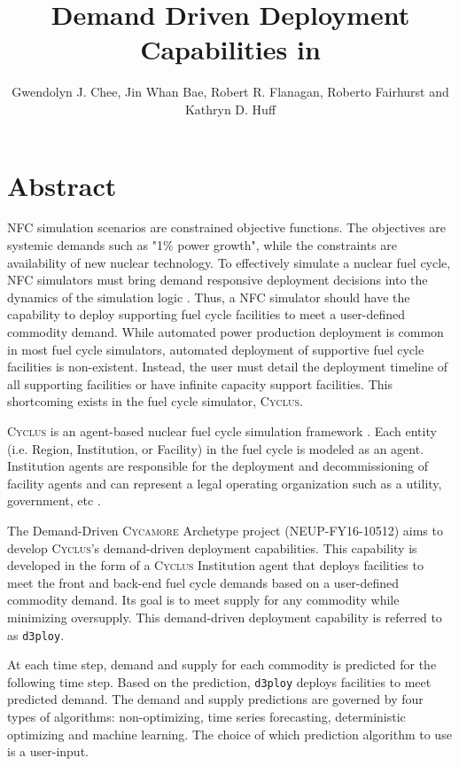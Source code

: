 \documentclass{anstrans}
\title{Demand Driven Deployment Capabilities in \Cyclus}
\author{Gwendolyn J. Chee, Jin Whan Bae, Robert R. Flanagan, Roberto Fairhurst and Kathryn D. Huff}
\institute{
Dept. of Nuclear, Plasma and Radiological Engineering, University of Illinois at Urbana-Champaign \\
gchee2@illinois.edu
}
\newcommand{\Cyclus}{\textsc{Cyclus}\xspace}%
\newcommand{\Cycamore}{\textsc{Cycamore}\xspace}%
\begin{document}
\section{Abstract}
\gls{NFC} simulation scenarios are constrained objective functions. 
The objectives are systemic demands such as "1\% power growth", while the 
constraints are availability of new nuclear technology. 
To effectively simulate a nuclear fuel cycle, \gls{NFC} simulators 
must bring demand responsive deployment decisions into the dynamics of the 
simulation logic \cite{huff_current_2017}. 
Thus, a \gls{NFC} simulator should have the capability to deploy 
supporting fuel cycle facilities to meet a user-defined commodity demand. 
While automated power production deployment is common in most fuel cycle simulators, automated deployment of supportive fuel cycle 
facilities is non-existent. 
Instead, the user must detail the deployment timeline of all supporting 
facilities or have infinite capacity support facilities. This shortcoming 
exists in the fuel cycle simulator, \Cyclus. 

\Cyclus is an agent-based nuclear fuel cycle simulation framework 
\cite{huff_fundamental_2016}. 
Each entity (i.e. Region, Institution, or Facility) in the fuel cycle is modeled 
as an agent. 
Institution agents
are responsible for the deployment and decommissioning of facility agents and
can represent a legal operating organization such as a 
utility, government, etc \cite{huff_fundamental_2016}. 

The Demand-Driven \Cycamore Archetype project (NEUP-FY16-10512) aims to 
develop \Cyclus's demand-driven deployment capabilities. 
This capability is developed in the form of a \Cyclus Institution agent that 
deploys facilities to meet the front and back-end fuel cycle demands
based on a user-defined commodity demand. 
Its goal is to meet supply for any commodity while minimizing oversupply.
This demand-driven deployment capability is referred to as \texttt{d3ploy}. 

At each time step, demand and supply for each commodity is predicted for the 
following time step. Based on the prediction, \texttt{d3ploy} deploys facilities to 
meet predicted demand. 
The demand and supply predictions are governed by four types of algorithms: 
non-optimizing, time series forecasting, deterministic optimizing and machine 
learning. 
The choice of which prediction algorithm to use is a user-input. 
\end{document}
